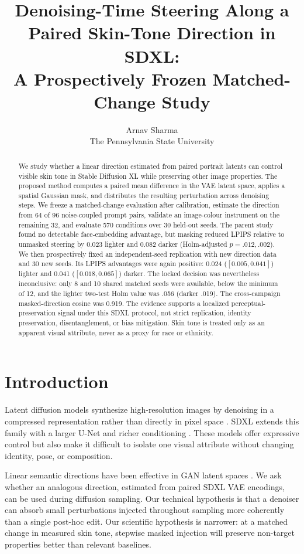 \documentclass[10pt]{article}
\title{Denoising-Time Steering Along a Paired Skin-Tone Direction in SDXL:\\
A Prospectively Frozen Matched-Change Study}
\author{Arnav Sharma\\
The Pennsylvania State University}
\date{}
\begin{document}
\maketitle

\begin{abstract}
We study whether a linear direction estimated from paired portrait latents can
control visible skin tone in Stable Diffusion XL while preserving other image
properties. The proposed method computes a paired mean difference in the VAE
latent space, applies a spatial Gaussian mask, and distributes the resulting
perturbation across denoising steps. We freeze a matched-change evaluation
after calibration, estimate the direction from 64 of 96 noise-coupled prompt
pairs, validate an image-colour instrument on the remaining 32, and evaluate
570 conditions over 30 held-out seeds. The parent study found no detectable
face-embedding advantage, but masking reduced LPIPS relative to unmasked
steering by 0.023 lighter and 0.082 darker (Holm-adjusted $p=.012,.002$).
We then prospectively fixed an independent-seed replication with new direction
data and 30 new seeds. Its LPIPS advantages were again positive: 0.024
($[0.005,0.041]$) lighter and 0.041 ($[0.018,0.065]$) darker. The locked
decision was nevertheless inconclusive: only 8 and 10 shared matched seeds
were available, below the minimum of 12, and the lighter two-test Holm value
was .056 (darker .019). The cross-campaign masked-direction cosine was 0.919.
The evidence supports a localized perceptual-preservation signal under this
SDXL protocol, not strict replication, identity preservation, disentanglement,
or bias mitigation. Skin tone is treated only as an apparent visual attribute,
never as a proxy for race or ethnicity.
\end{abstract}

\section{Introduction}

Latent diffusion models synthesize high-resolution images by denoising in a
compressed representation rather than directly in pixel space
\cite{rombach2022ldm}. SDXL extends this family with a larger U-Net and richer
conditioning \cite{podell2023sdxl}. These models offer expressive control but
also make it difficult to isolate one visual attribute without changing
identity, pose, or composition.

Linear semantic directions have been effective in GAN latent spaces
\cite{shen2020interfacegan}. We ask whether an analogous direction, estimated
from paired SDXL VAE encodings, can be used during diffusion sampling. Our
technical hypothesis is that a denoiser can absorb small perturbations injected
throughout sampling more coherently than a single post-hoc edit. Our scientific
hypothesis is narrower: at a matched change in measured skin tone, stepwise
masked injection will preserve non-target properties better than relevant
baselines.
\end{document}
